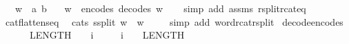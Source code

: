 \begin{isabellebody}
\ \ \ {\isachardoublequoteopen}w\ {\isacharequal}{\kern0pt}\ {\isacharbrackleft}{\kern0pt}a{\isacharcomma}{\kern0pt}\ b{\isacharbrackright}{\kern0pt}{\isachardoublequoteclose}\isanewline
\ \ \ {\isachardoublequoteopen}w\ {\isacharequal}{\kern0pt}\ encode{\isacharunderscore}{\kern0pt}s{}{}\ {\isacharparenleft}{\kern0pt}decode{\isacharunderscore}{\kern0pt}s{}{}\ w{\isacharparenright}{\kern0pt}{\isachardoublequoteclose}\isanewline
%
\isadelimproof
\ \ %
\endisadelimproof
%
\isatagproof
{}\isamarkupfalse%
\ {\isacharparenleft}{\kern0pt}simp\ add{\isacharcolon}{\kern0pt}\ assms\ rsplit{\isacharunderscore}{\kern0pt}rcat{\isacharunderscore}{\kern0pt}eq{\isacharparenright}{\kern0pt}%
\endisatagproof
{\isafoldproof}%
%
\isadelimproof
\isanewline
%
\endisadelimproof
\isanewline
{}\isamarkupfalse%
\ cat{\isacharunderscore}{\kern0pt}flatten{\isacharunderscore}{\kern0pt}s{}{}{\isacharunderscore}{\kern0pt}eq{\isacharcolon}{\kern0pt}\isanewline
\ \ {\isachardoublequoteopen}cat{\isacharunderscore}{\kern0pt}s{}{}\ {\isacharparenleft}{\kern0pt}s{}{}{\isacharunderscore}{\kern0pt}split\ w{\isacharparenright}{\kern0pt}\ {\isacharequal}{\kern0pt}\ w{\isachardoublequoteclose}\ \isanewline
%
\isadelimproof
\ \ %
\endisadelimproof
%
\isatagproof
{}\isamarkupfalse%
\ {\isacharparenleft}{\kern0pt}simp\ add{\isacharcolon}{\kern0pt}\ word{\isacharunderscore}{\kern0pt}rcat{\isacharunderscore}{\kern0pt}rsplit{\isacharparenright}{\kern0pt}%
\endisatagproof
{\isafoldproof}%
%
\isadelimproof
\isanewline
%
\endisadelimproof
\isanewline
{}\isamarkupfalse%
\ decode{\isacharunderscore}{\kern0pt}encode{\isacharunderscore}{\kern0pt}s{}{}{\isacharcolon}{\kern0pt}\isanewline
\ \ \ {\isachardoublequoteopen}{\isacharminus}{\kern0pt}\ {\isacharparenleft}{\kern0pt}{}\ {\isacharcircum}{\kern0pt}\ {\isacharparenleft}{\kern0pt}LENGTH{\isacharparenleft}{\kern0pt}{}{}{\isacharparenright}{\kern0pt}\ {\isacharminus}{\kern0pt}\ {}{\isacharparenright}{\kern0pt}{\isacharparenright}{\kern0pt}\ {\isasymle}\ i{\isachardoublequoteclose}\isanewline
\ \ \ \ \ {\isachardoublequoteopen}i\ {\isacharless}{\kern0pt}\ {}\ {\isacharcircum}{\kern0pt}\ {\isacharparenleft}{\kern0pt}LENGTH{\isacharparenleft}{\kern0pt}{}{}{\isacharparenright}{\kern0pt}\ {\isacharminus}{\kern0pt}\ {}{\isacharparenright}{\kern0pt}{\isachardoublequoteclose}\isanewline

\end{isabellebody}
